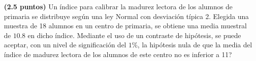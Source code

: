 
\textbf{(2.5 puntos)} Un índice para calibrar la madurez lectora de los alumnos de primaria se distribuye según una ley Normal con desviación típica 2. Elegida una muestra de 18 alumnos en un centro de primaria, se obtiene una media muestral de $10.8$ en dicho índice. Mediante el uso de un contraste de hipótesis, \textquestiondown{}se puede aceptar, con un nivel de significación del $1\%$, la hipótesis nula de que la media del índice de madurez lectora de los alumnos de este centro no es inferior a 11?
